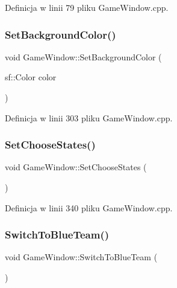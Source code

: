 Definicja w linii 79 pliku Game\+Window.\+cpp.

\mbox{\label{class_game_window_a856649fd2f3954b6ae3c6cf9da6b17a6}} 
\subsubsection{\texorpdfstring{Set\+Background\+Color()}{SetBackgroundColor()}}
{\footnotesize\ttfamily void Game\+Window\+::\+Set\+Background\+Color (\begin{DoxyParamCaption}\item[{sf\+::\+Color}]{color }\end{DoxyParamCaption})}



Definicja w linii 303 pliku Game\+Window.\+cpp.

\mbox{\label{class_game_window_a24b9dd0b93ad629da3b2e15661fdea0c}} 
\subsubsection{\texorpdfstring{Set\+Choose\+States()}{SetChooseStates()}}
{\footnotesize\ttfamily void Game\+Window\+::\+Set\+Choose\+States (\begin{DoxyParamCaption}{ }\end{DoxyParamCaption})}



Definicja w linii 340 pliku Game\+Window.\+cpp.

\mbox{\label{class_game_window_aa7c5976b188b842fc2ce45190b55bdfa}} 
\subsubsection{\texorpdfstring{Switch\+To\+Blue\+Team()}{SwitchToBlueTeam()}}
{\footnotesize\ttfamily void Game\+Window\+::\+Switch\+To\+Blue\+Team (\begin{DoxyParamCaption}{ }\end{DoxyParamCaption})}



